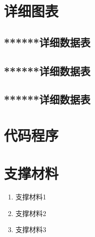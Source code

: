 \newpage
\appendix

\section{详细图表} %
\subsection*{******详细数据表}%
\label{xxtb1}

\subsection*{******详细数据表}
\label{xxtb2}

\subsection*{******详细数据表}
\label{xxtb3}


\section{代码程序}






\section{支撑材料}

\begin{enumerate}
	\item 	支撑材料1
	
	\item 	支撑材料2
	
	\item 	支撑材料3
\end{enumerate}

